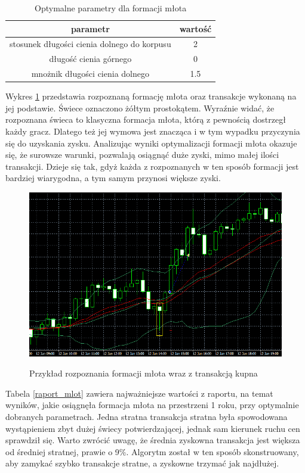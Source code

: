 \documentclass[pdflatex,11pt]{aghdpl}
\begin{document}
\begin{table}[h!]
\caption{Optymalne parametry dla formacji młota}
\begin{center}
\begin{tabular}{|c|c|}
\hline 
parametr & wartość \\
\hline
stosunek długości cienia dolnego do korpusu & 2\\
\hline
długość cienia górnego & 0\\
\hline
mnożnik długości cienia dolnego & 1.5\\
\hline
\end{tabular} 
\label{parametry_mlot}
\end{center}
\end{table}

Wykres \ref{przyklad_mlot} przedstawia rozpoznaną formację młota oraz transakcje wykonaną na jej podstawie. Świece oznaczono żółtym prostokątem. Wyraźnie widać, że rozpoznana świeca to klasyczna formacja młota, którą z pewnością dostrzegł każdy gracz. Dlatego też jej wymowa jest znacząca i w tym wypadku przyczynia się do uzyskania zysku. Analizując wyniki optymalizacji formacji młota okazuje się, że surowsze warunki, pozwalają osiągnąć duże zyski, mimo małej ilości transakcji. Dzieje się tak, gdyż każda z rozpoznanych w ten sposób formacji jest bardziej wiarygodna, a tym samym przynosi większe zyski. 
\begin{figure}[h!]
\caption{Przykład rozpoznania formacji młota wraz z transakcją kupna}
\begin{center}
\includegraphics[width=14cm]{hammer/przyklad.png}
\label{przyklad_mlot}
\end{center}
\end{figure} 
Tabela \ref{raport_mlot} zawiera najważniejsze wartości z raportu, na temat wyników, jakie osiągnęła formacja młota na przestrzeni 1 roku, przy optymalnie dobranych parametrach. Jedna stratna transakcja stratna była spowodowana wystąpieniem zbyt dużej świecy potwierdzającej, jednak sam kierunek ruchu cen sprawdził się. Warto zwrócić uwagę, że średnia zyskowna transakcja jest większa od średniej stratnej, prawie o 9\%. Algorytm został w ten sposób skonstruowany, aby zamykać szybko transakcje stratne, a zyskowne trzymać jak najdłużej.
\end{document}
